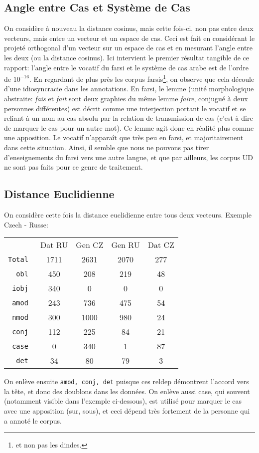 \documentclass{cours}
\begin{document}
    \subsection{Angle entre Cas et Système de Cas}
    On considère à nouveau la distance cosinus, mais cette fois-ci, non pas entre deux vecteurs, mais entre un vecteur et un espace de cas.
    Ceci est fait en considérant le projeté orthogonal d'un vecteur sur un espace de cas et en mesurant l'angle entre les deux (ou la distance cosinus).
    Ici intervient le premier résultat tangible de ce rapport: l'angle entre le vocatif du farsi et le système de cas arabe est de l'ordre de $10^{-16}$.
    En regardant de plus près les corpus farsis\footnote{et non pas les dindes.}, on observe que cela découle d'une idiosyncracie dans les annotations.
    En farsi, le lemme (unité morphologique abstraite: \textsl{fais} et \textsl{fait} sont deux graphies du même lemme \textsl{faire}, conjugué à deux personnes différentes)
    est décrit comme une interjection portant le vocatif et se reliant à un nom au cas absolu par la relation de transmission de cas (c'est à dire de marquer le cas pour un autre mot).
    Ce lemme agit donc en réalité plus comme une apposition.
    Le vocatif n'apparaît que très peu en farsi, et majoritairement dans cette situation.
    Ainsi, il semble que nous ne pouvons pas tirer d'enseignements du farsi vers une autre langue, et que par ailleurs, les corpus UD ne sont pas faits pour ce genre de traitement.

    \subsection{Distance Euclidienne}
    On considère cette fois la distance euclidienne entre tous deux vecteurs.
    Exemple Czech - Russe:
    \begin{tabular}{>{\tt}rcccc}
        &Dat RU & Gen CZ & Gen RU & Dat CZ\\
        Total & 1711 & 2631 & 2070 & 277\\
        obl & 450 & 208 & 219 & 48\\
        iobj & 340 & 0 & 0 & 0\\
        amod & 243 & 736 & 475 & 54\\
        nmod & 300 & 1000 & 980 & 24\\
        conj & 112 & 225 & 84 & 21\\
        case & 0 & 340 & 1 & 87\\
        det & 34 & 80 & 79 & 3
    \end{tabular}
    On enlève ensuite \texttt{amod, conj, det} puisque ces reldep démontrent l'accord vers la tête, et donc des doublons dans les données.
    On enlève aussi case, qui souvent (notamment visible dans l'exemple ci-dessous), est utilisé pour marquer le cas avec une apposition (sur, sous), et ceci dépend très fortement de la personne qui a annoté le corpus.
\end{document}
